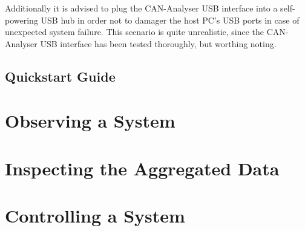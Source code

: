\documentclass[12pt,a4paper]{scrartcl}
\begin{document}
Additionally it is advised to plug the CAN-Analyser USB interface into a self-powering USB hub in order not to damager the host PC's USB ports in case of unexpected system failure. This scenario is quite unrealistic, since the CAN-Analyser USB interface has been tested thoroughly, but worthing noting.

\subsection{Quickstart Guide}
\label{subsec:GettingStartedQuickStart}

\section{Observing a System}
\label{sec:Observing}

\section{Inspecting the Aggregated Data}
\label{sec:Inspecting}

\section{Controlling a System}
\label{sec:Controlling}
\end{document}
